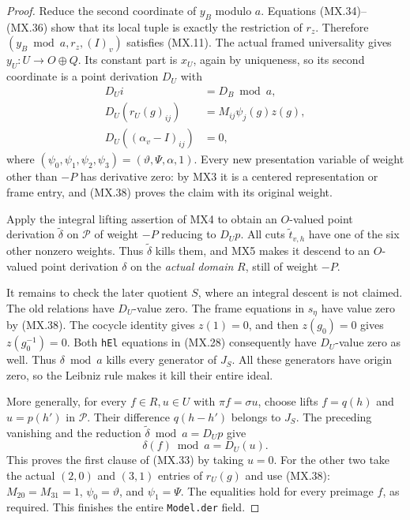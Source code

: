 \begin{proof}
Reduce the second coordinate of $y_B$ modulo $a$.
Equations (MX.34)--(MX.36) show that its local tuple
is exactly the restriction of $r_z$.  Therefore
$(y_B\bmod a,r_z,(I)_v)$ satisfies (MX.11).
The actual framed universality gives
$y_U:U\to O\oplus Q$.
Its constant part is $x_U$, again by uniqueness, so
its second coordinate is a point derivation $D_U$ with
\[
 \begin{split}
 D_Ui&=D_B\bmod a,\\
 D_U(r_U(g)_{ij})&=M_{ij}\psi_j(g)z(g),\\
 D_U((\alpha_v-I)_{ij})&=0,
 \end{split}
 \tag{MX.38}
\]
where $(\psi_0,\psi_1,\psi_2,\psi_3)
=(\vartheta,\Psi,\alpha,1)$.
Every new presentation variable of weight other than
$-P$ has derivative zero: by MX3 it is a centered
representation or frame entry, and (MX.38) proves the
claim with its original weight.

Apply the integral lifting assertion of MX4 to obtain
an $O$-valued point derivation $\widetilde\delta$ on
$\mathcal P$ of weight $-P$ reducing to $D_Up$.
All cuts $\widetilde t_{v,h}$ have one of the six other
nonzero weights.  Thus $\widetilde\delta$ kills them,
and MX5 makes it descend to an $O$-valued point
derivation $\delta$ on the \emph{actual domain} $R$,
still of weight $-P$.

It remains to check the later quotient $S$, where an
integral descent is not claimed.  The old relations have
$D_U$-value zero.  The frame equations in $s_\eta$
have value zero by (MX.38).  The cocycle identity gives
$z(1)=0$, and then $z(g_0)=0$ gives $z(g_0^{-1})=0$.
Both \texttt{hEl} equations in (MX.28) consequently
have $D_U$-value zero as well.
Thus $\delta\bmod a$ kills every generator of $J_S$.
All these generators have origin zero, so the Leibniz
rule makes it kill their entire ideal.

More generally, for every $f\in R,u\in U$ with
$\pi f=\sigma u$, choose lifts $f=q(h)$ and $u=p(h')$
in $\mathcal P$.  Their difference $q(h-h')$ belongs
to $J_S$.  The preceding vanishing and the reduction
$\widetilde\delta\bmod a=D_Up$ give
\[
                  \delta(f)\bmod a=D_U(u).
 \tag{MX.39}
\]
This proves the first clause of (MX.33) by taking $u=0$.
For the other two take the actual $(2,0)$ and $(3,1)$
entries of $r_U(g)$ and use (MX.38): $M_{20}=M_{31}=1$,
$\psi_0=\vartheta$, and $\psi_1=\Psi$.
The equalities hold for every preimage $f$, as required.
This finishes the entire \texttt{Model.der} field.
\end{proof}

